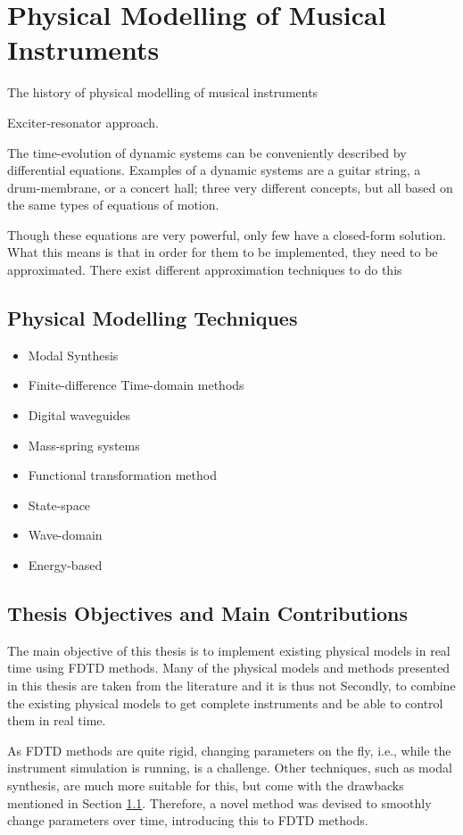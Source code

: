 \chapter{Physical Modelling of Musical Instruments}\label{ch:physMod}

The history of physical modelling of musical instruments

Exciter-resonator approach. 

The time-evolution of dynamic systems can be conveniently described by differential equations. Examples of a dynamic systems are a guitar string, a drum-membrane, or a concert hall; three very different concepts, but all based on the same types of equations of motion.

Though these equations are very powerful, only few have a closed-form solution. What this means is that in order for them to be implemented, they need to be approximated. There exist different approximation techniques to do this  

\section{Physical Modelling Techniques}\label{sec:physModTech}
\begin{itemize}
    \item Modal Synthesis
    \item Finite-difference Time-domain methods
    \item Digital waveguides
    \item Mass-spring systems
    \item Functional transformation method
    \item State-space
    \item Wave-domain
    \item Energy-based
\end{itemize}
    
\section{Thesis Objectives and Main Contributions}
The main objective of this thesis is to implement existing physical models in real time using FDTD methods. Many of the physical models and methods presented in this thesis are taken from the literature and it is thus not  Secondly, to combine the existing physical models to get complete instruments and be able to control them in real time.

As FDTD methods are quite rigid, changing parameters on the fly, i.e., while the instrument simulation is running, is a challenge.  Other techniques, such as modal synthesis, are much more suitable for this, but come with the drawbacks mentioned in Section \ref{sec:physModTech}. Therefore, a novel method was devised to smoothly change parameters over time, introducing this to FDTD methods. 

